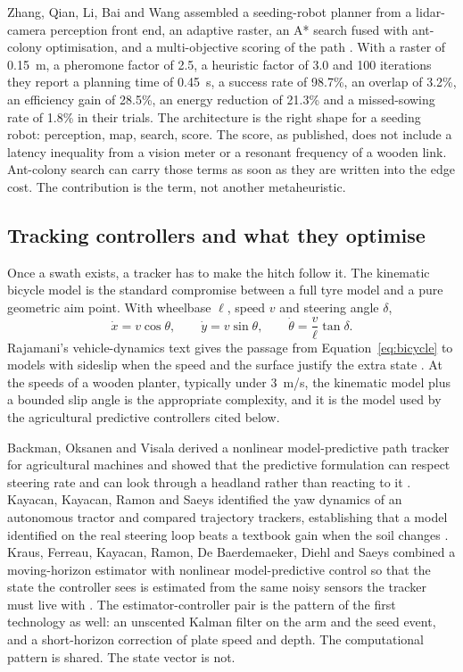 Zhang, Qian, Li, Bai and Wang assembled a seeding-robot planner from a lidar-camera perception front end, an adaptive raster, an A* search fused with ant-colony optimisation, and a multi-objective scoring of the path \cite{zhang2025path,dorigo2006}. With a raster of \SI{0.15}{m}, a pheromone factor of \num{2.5}, a heuristic factor of \num{3.0} and \num{100} iterations they report a planning time of \SI{0.45}{s}, a success rate of \num{98.7}\%, an overlap of \num{3.2}\%, an efficiency gain of \num{28.5}\%, an energy reduction of \num{21.3}\% and a missed-sowing rate of \num{1.8}\% in their trials. The architecture is the right shape for a seeding robot: perception, map, search, score. The score, as published, does not include a latency inequality from a vision meter or a resonant frequency of a wooden link. Ant-colony search can carry those terms as soon as they are written into the edge cost. The contribution is the term, not another metaheuristic.

\subsection{Tracking controllers and what they optimise}

Once a swath exists, a tracker has to make the hitch follow it. The kinematic bicycle model is the standard compromise between a full tyre model and a pure geometric aim point. With wheelbase \(\ell\), speed \(v\) and steering angle \(\delta\),
\begin{equation}
\label{eq:bicycle}
\dot{x} = v\cos\theta,\qquad
\dot{y} = v\sin\theta,\qquad
\dot{\theta} = \frac{v}{\ell}\tan\delta .
\end{equation}
Rajamani's vehicle-dynamics text gives the passage from Equation~\eqref{eq:bicycle} to models with sideslip when the speed and the surface justify the extra state \cite{rajamani2012}. At the speeds of a wooden planter, typically under \SI{3}{m/s}, the kinematic model plus a bounded slip angle is the appropriate complexity, and it is the model used by the agricultural predictive controllers cited below.

Backman, Oksanen and Visala derived a nonlinear model-predictive path tracker for agricultural machines and showed that the predictive formulation can respect steering rate and can look through a headland rather than reacting to it \cite{backman2012}. Kayacan, Kayacan, Ramon and Saeys identified the yaw dynamics of an autonomous tractor and compared trajectory trackers, establishing that a model identified on the real steering loop beats a textbook gain when the soil changes \cite{kayacan2015}. Kraus, Ferreau, Kayacan, Ramon, De Baerdemaeker, Diehl and Saeys combined a moving-horizon estimator with nonlinear model-predictive control so that the state the controller sees is estimated from the same noisy sensors the tracker must live with \cite{kraus2013}. The estimator-controller pair is the pattern of the first technology as well: an unscented Kalman filter on the arm and the seed event, and a short-horizon correction of plate speed and depth. The computational pattern is shared. The state vector is not.

